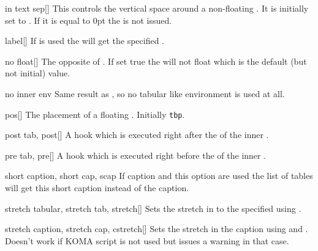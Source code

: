 \begin{describeopt}{in text sep}[]%
  This controls the vertical space around a non-floating . It is
  initially set to . If it is equal to 0pt the  is not
  issued.
\end{describeopt}%
\begin{describeopt}{label}[]%
  If  is used the  will get the specified
  .
\end{describeopt}%
\begin{describeopt}{no float}[]%
  The opposite of . If set true the  will not float
  which is the default (but not initial) value.
\end{describeopt}%
\begin{describeopt}{no inner env}%
  Same result as , so no tabular like
  environment is used at all.
\end{describeopt}%
\begin{describeopt}{pos}[]%
  The placement of a floating . Initially \texttt{tbp}.
\end{describeopt}%
\begin{describeopt}{post tab, post}[]%
  A hook which is executed right after the  of the inner
  .
\end{describeopt}%
\begin{describeopt}{pre tab, pre}[]%
  A hook which is executed right before the  of the inner
  .
\end{describeopt}%
\begin{describeopt}{short caption, short cap, scap}%
  If caption and this option are used the list of tables will get this short
  caption instead of the caption.
\end{describeopt}%
\begin{describeopt}{stretch tabular, stretch tab, stretch}[]%
  Sets the stretch in  to the specified  using
  .
\end{describeopt}%
\begin{describeopt}{stretch caption, stretch cap, cstretch}[]%
  Sets the stretch in the caption using  and .
  Doesn't work if KOMA script is not used but issues a warning in that case.
\end{describeopt}%
